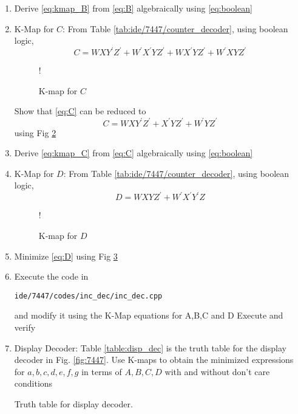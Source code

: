 \begin{enumerate}[label=\arabic*.,ref=\theenumi]
\begin{equation}
\end{equation}
%
\begin{figure}[!ht]
\resizebox {\columnwidth} {!} {

}
\caption{K-map for $B$}
\label{fig:kmap_B}
\end{figure}
%
Show that \eqref{eq:B} can be reduced to
\begin{equation}
\label{eq:kmap_B}
B = WX^{\prime}Z^{\prime} + W^{\prime}XZ^{\prime}
\end{equation}
using Fig \ref{fig:kmap_B}
\item Derive \eqref{eq:kmap_B} from \eqref{eq:B} algebraically using \eqref{eq:boolean}
%
%
\item {K-Map for $C$: }
From Table \ref{tab:ide/7447/counter_decoder}, using boolean logic,
\begin{equation}
\label{eq:C}
C = WXY^{\prime}Z^{\prime} + W^{\prime}X^{\prime}YZ^{\prime}
+WX^{\prime}YZ^{\prime}
+W^{\prime}XYZ^{\prime}
\end{equation}
%
%
\begin{figure}[!ht]
\resizebox {\columnwidth} {!} {

}
\caption{K-map for $C$}
\label{fig:kmap_C}
\end{figure}
%
Show that \eqref{eq:C} can be reduced to
\begin{equation}
\label{eq:kmap_C}
C = WXY^{\prime}Z^{\prime}  +  X^{\prime}YZ^{\prime} + W^{\prime}YZ^{\prime}
\end{equation}
using Fig \ref{fig:kmap_C}
%
\item 
Derive \eqref{eq:kmap_C} from \eqref{eq:C} algebraically using \eqref{eq:boolean}
%
\item {K-Map for $D$: }
From Table \ref{tab:ide/7447/counter_decoder}, using boolean logic,
\begin{equation}
\label{eq:D}
D = WXYZ^{\prime} + W^{\prime}X^{\prime}Y^{\prime}Z
\end{equation}
%
\begin{figure}[!ht]
\resizebox {\columnwidth} {!} {

}
\caption{K-map for $D$}
\label{fig:kmap_D}
\end{figure}
%
\item 
Minimize \eqref{eq:D} using Fig \ref{fig:kmap_D}
%
\item Execute the code in
\begin{lstlisting}
ide/7447/codes/inc_dec/inc_dec.cpp
\end{lstlisting}
%
and modify it using the K-Map equations for A,B,C and D Execute and verify
\item {Display Decoder:}
Table \ref{table:disp_dec} is the truth table for the display decoder in Fig.
\ref{fig:7447}.
Use K-maps to obtain the minimized expressions for $a,b,c,d,e,f,g$ in terms of $A,B,C,D$ with and without don't care conditions
%
\begin{table*}[!ht]
	\centering

\caption{Truth table for display decoder.}
\label{table:disp_dec}
\end{table*}
\end{enumerate}

